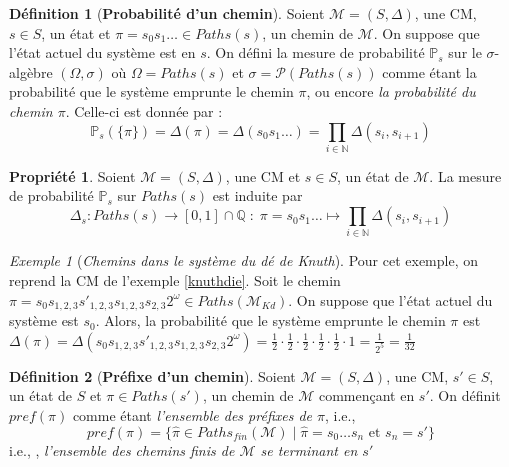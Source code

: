 \documentclass[12pt,a4paper]{report}
\theoremstyle{definition}%
\newtheorem{definition}{Définition}[chapter]
\newtheorem{propriete}{Propriété}[chapter]
\theoremstyle{remark}
\newtheorem{example}{Exemple}[chapter]
\newcommand{\ie}{i.e., }
\newcommand{\pr}{\mathbb{P}}
\begin{document}
\begin{definition}[\textbf{Probabilité d'un chemin}]
	Soient $\mathcal{M}=(S, \Delta)$, une CM, $s \in S$, un état et $\pi = s_0 s_1 \dots \in Paths(s)$, un chemin de $\mathcal{M}$. On suppose que l'état actuel du système est en $s$.
	On défini la mesure de probabilité $\pr_{s}$ sur le $\sigma$-algèbre $(\Omega, \sigma)$ où $\Omega = Paths(s)$ et $\sigma = \mathcal{P}(Paths(s))$ comme étant la probabilité que le système emprunte le chemin $\pi$, ou encore \textit{la probabilité du chemin $\pi$}. Celle-ci est donnée par : 
	\[ \pr_{s}(\{\pi\}) = \Delta(\pi) = \Delta(s_0 s_1 \dots) = \prod_{i \in \mathbb{N}} \Delta(s_i, s_{i+1}) \]
\end{definition}

\begin{propriete} Soient $\mathcal{M} = (S, \Delta)$, une CM et $s \in S$, un état de $\mathcal{M}$.
	La mesure de probabilité $\pr_{s}$ sur $Paths(s)$ est induite par
	\[\Delta_s : Paths(s) \rightarrow [0, 1] \cap \mathbb{Q} \; : \; \pi = s_0 s_1 \dots \mapsto \prod_{i \in \mathbb{N}} \Delta(s_i, s_{i+1}) \]
\end{propriete}


\begin{example}[\textit{Chemins dans le système du dé de Knuth}]
	Pour cet exemple, on reprend la CM de l'exemple \ref{knuthdie}. Soit le chemin $\pi = s_0 s_{1,2,3} s'_{1, 2, 3} s_{1,2,3} s_{2,3} 2^\omega \in Paths(\mathcal{M}_{Kd})$.
	On suppose que l'état actuel du système est $s_0$. Alors, la probabilité que le système emprunte le chemin $\pi$ est $\Delta(\pi) = \Delta(s_0 s_{1,2,3} s'_{1, 2, 3} s_{1,2,3} s_{2,3} 2^\omega) = \frac{1}{2} \cdot \frac{1}{2} \cdot \frac{1}{2} \cdot \frac{1}{2} \cdot \frac{1}{2} \cdot 1 = \frac{1}{2^5} = \frac{1}{32}$
\end{example}

\begin{definition}[\textbf{Préfixe d'un chemin}]
	Soient $\mathcal{M} = (S, \Delta)$, une CM, $s' \in S$, un état de $S$ et $\pi \in Paths(s')$, un chemin de $\mathcal{M}$ commençant en $s'$. On définit $pref(\pi)$ comme étant \textit{l'ensemble des préfixes de $\pi$}, \ie 
	\[ pref(\pi) = \{ \hat{\pi} \in Paths_{fin}(\mathcal{M}) \; | \; \hat{\pi} = s_0 \dots s_n \text{ et } s_n = s' \} \]
	\ie, \textit{l'ensemble des chemins finis de $\mathcal{M}$ se terminant en $s'$}
\end{definition}
\end{document}
